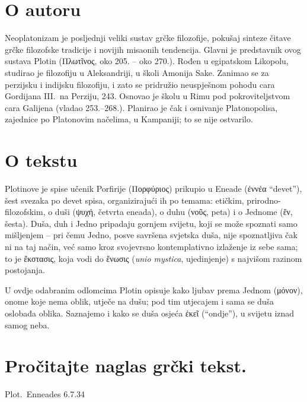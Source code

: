 \section*{O autoru}

Neoplatonizam je posljednji veliki sustav grčke filozofije, pokušaj sinteze čitave grčke filozofske tradicije i novijih misaonih tendencija. Glavni je predstavnik ovog sustava Plotin \textgreek[variant=ancient]{(Πλωτῖνος,} oko 205. – oko 270.). Rođen u egipatskom Likopolu, studirao je filozofiju u Aleksandriji, u školi Amonija Sake. Zanimao se za perzijsku i indijsku filozofiju, i zato se pridružio neuspješnom pohodu cara Gordijana III.\ na Perziju, 243. Osnovao je školu u Rimu pod pokroviteljstvom cara Galijena (vladao 253.–268.). Planirao je čak i osnivanje Platonopolisa, zajednice po Platonovim načelima, u Kampaniji; to se nije ostvarilo.

\section*{O tekstu}

Plotinove je spise učenik Porfirije \textgreek[variant=ancient]{(Πορφύριος)} prikupio u Eneade \textgreek[variant=ancient]{(ἐννέα} ``devet''), šest svezaka po devet spisa, organizirajući ih po temama: etičkim, prirodno-filozofskim, o duši \textgreek[variant=ancient]{(ψυχή,} četvrta eneada), o duhu \textgreek[variant=ancient]{(νοῦς,} peta) i o Jednome \textgreek[variant=ancient]{(ἕν,} šesta). Duša, duh i Jedno pripadaju gornjem svijetu, koji se može spoznati samo mišljenjem – pri čemu Jedno, posve savršena svjetska duša, nije spoznatljiva čak ni na taj način, već samo kroz svojevrsno kontemplativno izlaženje iz sebe sama; to je ἔκστασις, koja vodi do ἕνωσις (\textit{unio mystica}, ujedinjenje) s najvišom razinom postojanja.

U ovdje odabranim odlomcima Plotin opisuje kako ljubav prema Jednom \textgreek[variant=ancient]{(μόνον),} onome koje nema oblik, utječe na dušu; pod tim utjecajem i sama se duša oslobađa oblika. Saznajemo i kako se duša osjeća \textgreek[variant=ancient]{ἐκεῖ} (``ondje''), u svijetu iznad samog neba.

\section*{Pročitajte naglas grčki tekst.}

Plot.\ Enneades 6.7.34


